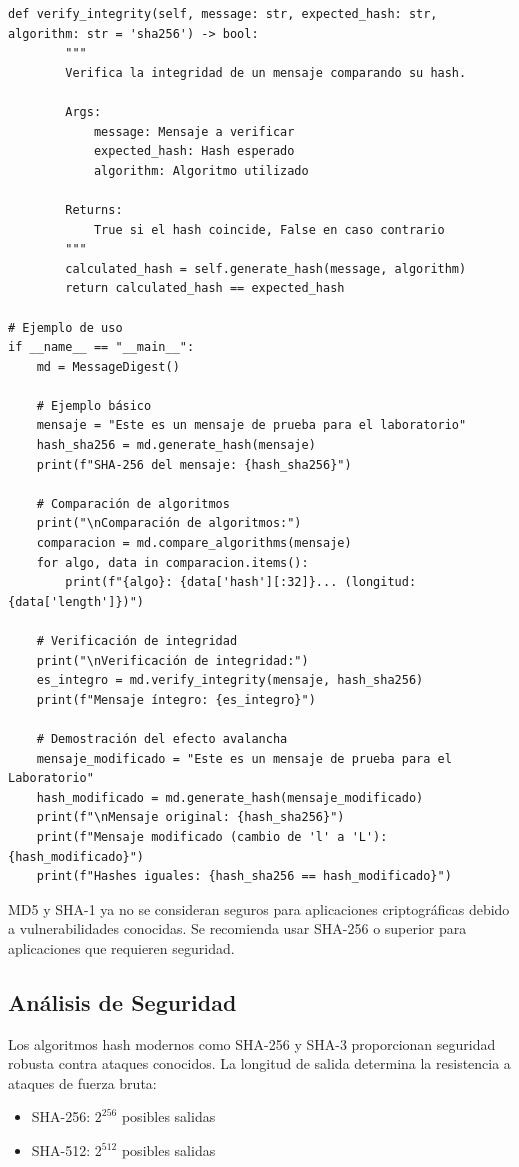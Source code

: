 \documentclass[12pt,a4paper]{article}
\begin{document}
\begin{lstlisting}[caption=Implementación de funciones hash criptográficas]
    def verify_integrity(self, message: str, expected_hash: str, algorithm: str = 'sha256') -> bool:
        """
        Verifica la integridad de un mensaje comparando su hash.
        
        Args:
            message: Mensaje a verificar
            expected_hash: Hash esperado
            algorithm: Algoritmo utilizado
            
        Returns:
            True si el hash coincide, False en caso contrario
        """
        calculated_hash = self.generate_hash(message, algorithm)
        return calculated_hash == expected_hash

# Ejemplo de uso
if __name__ == "__main__":
    md = MessageDigest()
    
    # Ejemplo básico
    mensaje = "Este es un mensaje de prueba para el laboratorio"
    hash_sha256 = md.generate_hash(mensaje)
    print(f"SHA-256 del mensaje: {hash_sha256}")
    
    # Comparación de algoritmos
    print("\nComparación de algoritmos:")
    comparacion = md.compare_algorithms(mensaje)
    for algo, data in comparacion.items():
        print(f"{algo}: {data['hash'][:32]}... (longitud: {data['length']})")
    
    # Verificación de integridad
    print("\nVerificación de integridad:")
    es_integro = md.verify_integrity(mensaje, hash_sha256)
    print(f"Mensaje íntegro: {es_integro}")
    
    # Demostración del efecto avalancha
    mensaje_modificado = "Este es un mensaje de prueba para el Laboratorio"
    hash_modificado = md.generate_hash(mensaje_modificado)
    print(f"\nMensaje original: {hash_sha256}")
    print(f"Mensaje modificado (cambio de 'l' a 'L'): {hash_modificado}")
    print(f"Hashes iguales: {hash_sha256 == hash_modificado}")
\end{lstlisting}

\begin{securitywarning}
	MD5 y SHA-1 ya no se consideran seguros para aplicaciones criptográficas debido a vulnerabilidades conocidas. Se recomienda usar SHA-256 o superior para aplicaciones que requieren seguridad.
\end{securitywarning}

\subsection{Análisis de Seguridad}

\begin{cryptoanalysis}
	Los algoritmos hash modernos como SHA-256 y SHA-3 proporcionan seguridad robusta contra ataques conocidos. La longitud de salida determina la resistencia a ataques de fuerza bruta:
	\begin{itemize}
		\item SHA-256: $2^{256}$ posibles salidas
		\item SHA-512: $2^{512}$ posibles salidas
	\end{itemize}
\end{cryptoanalysis}
\end{document}
